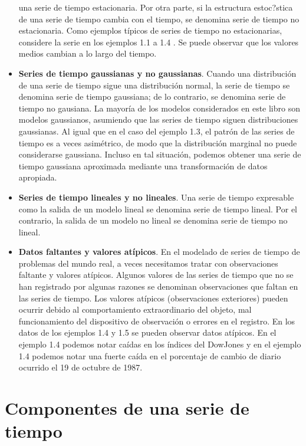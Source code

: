 \documentclass[12pt,]{krantz}
\theoremstyle{definition}
\theoremstyle{definition}
\theoremstyle{definition}
\theoremstyle{remark}
\begin{document}
\begin{itemize}
  una serie de tiempo estacionaria. Por otra parte, si la estructura
  estoc?stica de una serie de tiempo cambia con el tiempo, se denomina
  serie de tiempo no estacionaria. Como ejemplos típicos de series de
  tiempo no estacionarias, considere la serie en los ejemplos 1.1 a 1.4
  . Se puede observar que los valores medios cambian a lo largo del
  tiempo.
\item
  \textbf{Series de tiempo gaussianas y no gaussianas}. Cuando una
  distribución de una serie de tiempo sigue una distribución normal, la
  serie de tiempo se denomina serie de tiempo gaussiana; de lo
  contrario, se denomina serie de tiempo no gausiana. La mayoría de los
  modelos considerados en este libro son modelos gaussianos, asumiendo
  que las series de tiempo siguen distribuciones gaussianas. Al igual
  que en el caso del ejemplo 1.3, el patrón de las series de tiempo es a
  veces asimétrico, de modo que la distribución marginal no puede
  considerarse gaussiana. Incluso en tal situación, podemos obtener una
  serie de tiempo gaussiana aproximada mediante una transformación de
  datos apropiada.
\item
  \textbf{Series de tiempo lineales y no lineales}. Una serie de tiempo
  expresable como la salida de un modelo lineal se denomina serie de
  tiempo lineal. Por el contrario, la salida de un modelo no lineal se
  denomina serie de tiempo no lineal.
\item
  \textbf{Datos faltantes y valores atípicos}. En el modelado de series
  de tiempo de problemas del mundo real, a veces necesitamos tratar con
  observaciones faltante y valores atípicos. Algunos valores de las
  series de tiempo que no se han registrado por algunas razones se
  denominan observaciones que faltan en las series de tiempo. Los
  valores atípicos (observaciones exteriores) pueden ocurrir debido al
  comportamiento extraordinario del objeto, mal funcionamiento del
  dispositivo de observación o errores en el registro. En los datos de
  los ejemplos 1.4 y 1.5 se pueden observar datos atípicos. En el
  ejemplo 1.4 podemos notar caídas en los índices del DowJones y en el
  ejemplo 1.4 podemos notar una fuerte caída en el porcentaje de cambio
  de diario ocurrido el 19 de octubre de 1987.
\end{itemize}

\section{Componentes de una serie de
tiempo}\label{componentes-de-una-serie-de-tiempo}
\end{document}
